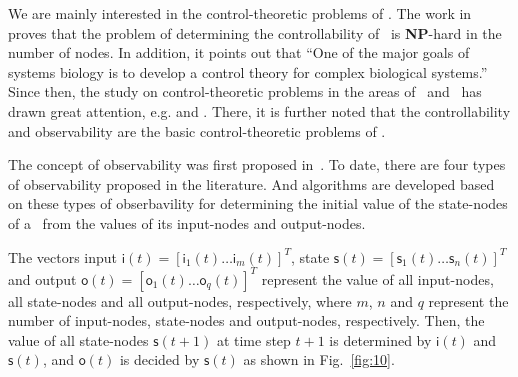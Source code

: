 We are mainly interested in the control-theoretic problems of \BCNs. The work in ~\cite{Akutsu2007Control} proves that the problem of determining the controllability of \BCNs\ is {\bf NP}-hard in the number of nodes. In addition, it points out that ``One of the major goals of systems biology is to develop a control theory for complex biological systems.'' Since then, the study on control-theoretic problems in the areas of \BNs\ and \BCNs\ has drawn great attention, e.g. \cite{cheng2009controllability, Zhao2010Input, Cheng2011Identification, Cheng2011Analysis} and \cite{Fornasini2013Observability}. There, it is further noted that the controllability and observability are the basic control-theoretic problems of \BCNs. %

 The concept of observability was first proposed in~\cite{cheng2009controllability}. To date, there are four types of observability proposed in the literature. And algorithms are developed based on these types of obserbavility for determining the initial value of the state-nodes of a \BCN\ from the values of its input-nodes and output-nodes. 

The vectors input $\mathsf{i}(t)=[\mathsf{i}_1(t)\ldots\mathsf{i}_m(t)]^T$, state $\mathsf{s}(t)=[\mathsf{s}_1(t) \ldots \mathsf{s}_n(t)]^T$ and output $\mathsf{o}(t)=[\mathsf{o}_1(t) \ldots \mathsf{o}_q(t)]^T$ represent the value of all input-nodes, all state-nodes and all output-nodes, respectively, where $m$, $n$ and $q$ represent the number of input-nodes, state-nodes and output-nodes, respectively. 
 Then, the value of all state-nodes $\mathsf{s}(t+1)$ at time step $t+1$ is determined by $\mathsf{i}(t)$ and $\mathsf{s}(t)$, and $\mathsf{o}(t)$ is decided by $\mathsf{s}(t)$ as shown in Fig.~\ref{fig:10}.


